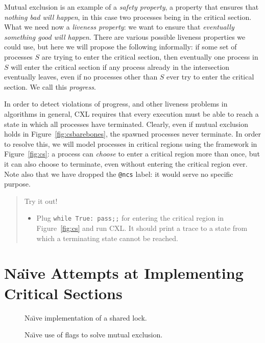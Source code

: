 \documentclass{report}
\newenvironment{code}{
\tcolorbox
}{
\endtcolorbox
}
\begin{document}
Mutual exclusion is an example of a \emph{safety property}, a
property that ensures that \emph{nothing bad will happen}, in this case
two processes being in the critical section.
What we need now a \emph{liveness property}: we want to ensure that
\emph{eventually something good will happen}.
There are various possible liveness properties we could use,
but here we will propose the following informally: if some set of processes
$S$ are trying to enter the critical section, then eventually one process in
$S$ will enter the critical section if any process already in the
intersection eventually leaves, even if no processes other than $S$ ever
try to enter the critical section.
We call this \emph{progress}.

In order to detect violations of progress, and other liveness problems in
algorithms in general, CXL requires that every execution must be
able to reach a state in which all processes have terminated.
Clearly, even if mutual exclusion holds in Figure~\ref{fig:csbarebones},
the spawned processes never terminate.  In order to resolve this, we
will model processes in critical regions using the framework in
Figure~\ref{fig:cs}: a process can \emph{choose} to enter a
critical region more than once, but it can also choose to terminate, even
without entering the critical region ever.
Note also that we have dropped the \texttt{@ncs} label: it would serve no
specific purpose.

\begin{quote}
Try it out!
\begin{itemize}
\item Plug \texttt{while True: pass;;} for entering the critical region
in Figure~\ref{fig:cs} and run CXL.  It should print a trace
to a state from which a terminating state cannot be reached.
\end{itemize}
\end{quote}


\chapter{Na\"{\i}ve Attempts at Implementing Critical Sections}

\begin{figure}
\begin{code}

\end{code}
\caption{Na\"{\i}ve implementation of a shared lock.}
\label{fig:uplock}
\end{figure}

\begin{figure}
\begin{code}

\end{code}
\caption{Na\"{\i}ve use of flags to solve mutual exclusion.}
\label{fig:upflags}
\end{figure}
\end{document}
